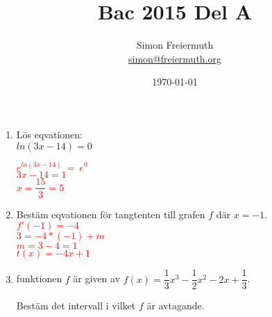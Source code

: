\documentclass[12pt, letterpaper, twoside]{article}
\title{Bac 2015 Del A}
\author{Simon Freiermuth \\ \href{mailto:simon@freiermuth.org}{simon@freiermuth.org}}
\date{\today}
\begin{document}
\maketitle

\begin{flushleft}

\begin{enumerate}[label=\textbf{\arabic*)}]
    \item
    Lös eqvationen:\\
    $ln(3x-14)=0$\\

    \hfill

    \textcolor{red}{
    $ e^{ln(3x-14)}\ =\ e^0 $\\
    $ 3x-14=1 $\\
    $ x=\dfrac{15}{3}=5 $
    }

    \hfill

   \item

   \hfill

   Bestäm eqvationen för tangtenten till grafen $ f $ där $ x=-1 $.\\

   \textcolor{red}{
      $ f'(-1)=-4 $\\
      $ 3=-4*(-1)+m $\\
      $ m=3-4 = 1 $\\
      $ t(x) = -4x+1 $
   }

   \hfill

   \item
   funktionen $ f $ är given av $ f(x)=\dfrac{1}{3}x^3-\dfrac{1}{2}x^2-2x+\dfrac{1}{3} $.

   Bestäm det intervall i vilket $ f $ är avtagande.


\end{enumerate}
\end{flushleft}
\end{document}

